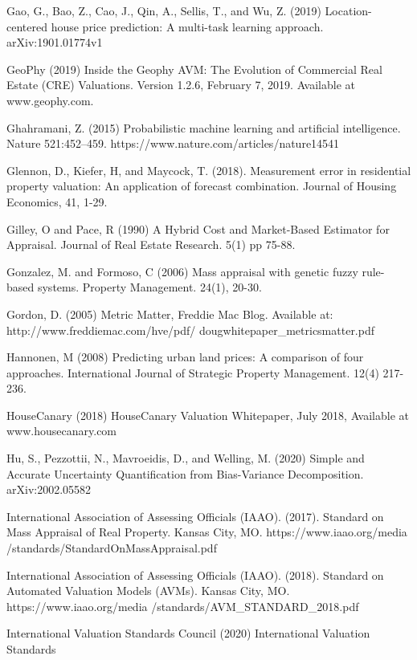 \documentclass[colTwo]{format}
\theoremstyle{definition}
\begin{document}
\begin{thebibliography}{50}
\harvarditem{}{}{}Gao, G., Bao, Z., Cao, J., Qin, A., Sellis, T., and Wu, Z. (2019) Location-centered house price prediction: A multi-task learning approach. arXiv:1901.01774v1

\harvarditem{}{}{}GeoPhy (2019) Inside the Geophy AVM: The Evolution of Commercial Real Estate (CRE) Valuations. Version 1.2.6, February 7, 2019.  Available at www.geophy.com. 

\harvarditem{}{}{}Ghahramani, Z. (2015) Probabilistic machine learning and artificial intelligence. Nature 521:452–459. https://www.nature.com/articles/nature14541

\harvarditem{}{}{}Glennon, D., Kiefer, H, and Maycock, T. (2018). Measurement error in residential property valuation: An application of forecast combination. Journal of Housing Economics, 41, 1-29. 

\harvarditem{}{}{}Gilley, O and Pace, R (1990) A Hybrid Cost and Market-Based Estimator for Appraisal. Journal of Real Estate Research. 5(1) pp 75-88. 

\harvarditem{}{}{}Gonzalez, M. and Formoso, C (2006) Mass appraisal with genetic fuzzy rule-based systems. Property Management. 24(1), 20-30. 

\harvarditem{}{}{}Gordon, D. (2005) Metric Matter, Freddie Mac Blog. Available at: http://www.freddiemac.com/hve/pdf/ dougwhitepaper\_metricsmatter.pdf

\harvarditem{}{}{}Hannonen, M (2008) Predicting urban land prices: A comparison of four approaches. International Journal of Strategic Property Management. 12(4) 217-236. 

\harvarditem{}{}{}HouseCanary (2018) HouseCanary Valuation Whitepaper, July 2018, Available at www.housecanary.com

\harvarditem{}{}{}Hu, S., Pezzottii, N., Mavroeidis, D., and Welling, M. (2020) Simple and Accurate Uncertainty Quantification from Bias-Variance Decomposition. arXiv:2002.05582

\harvarditem{}{}{}International Association of Assessing Officials (IAAO). (2017). Standard on Mass Appraisal of Real Property. Kansas City, MO. https://www.iaao.org/media /standards/StandardOnMassAppraisal.pdf

\harvarditem{}{}{}International Association of Assessing Officials (IAAO). (2018). Standard on Automated Valuation Models (AVMs). Kansas City, MO. https://www.iaao.org/media /standards/AVM\_STANDARD\_2018.pdf

\harvarditem{}{}{}International Valuation Standards Council (2020) International Valuation Standards 


\end{thebibliography}
\end{document}
